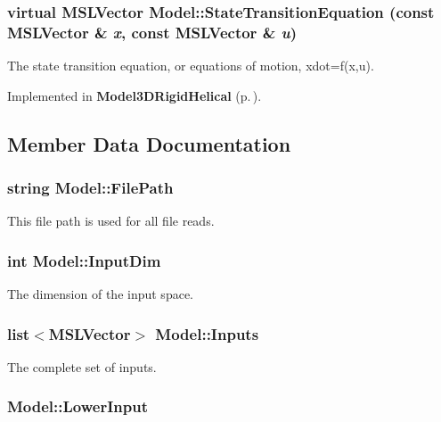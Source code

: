 \subsubsection{\setlength{\rightskip}{0pt plus 5cm}virtual {\bf MSLVector} Model::State\-Transition\-Equation (const {\bf MSLVector} \& {\em x}, const {\bf MSLVector} \& {\em u})\hspace{0.3cm}{\tt  [pure virtual]}}\label{classModel_a3}


The state transition equation, or equations of motion, xdot=f(x,u).



Implemented in {\bf Model3DRigid\-Helical} {\rm (p.\,\pageref{classModel3DRigidHelical_a2})}.

\subsection{Member Data Documentation}
\subsubsection{\setlength{\rightskip}{0pt plus 5cm}string Model::File\-Path}\label{classModel_m0}


This file path is used for all file reads.

\subsubsection{\setlength{\rightskip}{0pt plus 5cm}int Model::Input\-Dim}\label{classModel_m6}


The dimension of the input space.

\subsubsection{\setlength{\rightskip}{0pt plus 5cm}list$<${\bf MSLVector}$>$ Model::Inputs\hspace{0.3cm}{\tt  [protected]}}\label{classModel_n1}


The complete set of inputs.

\subsubsection{ Model::Lower\-Input}\label{classModel_m3}


